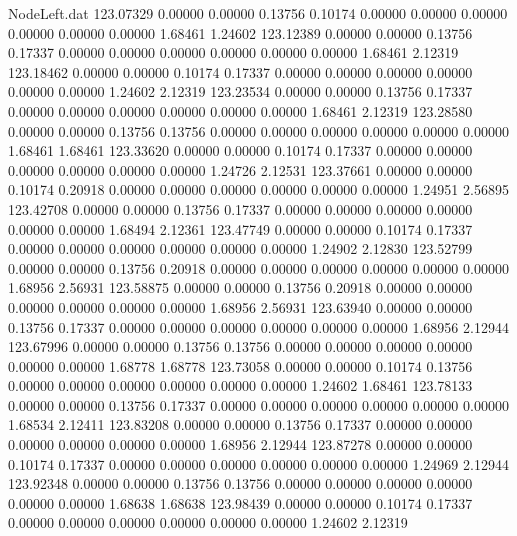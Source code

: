 \begin{filecontents}{NodeLeft.dat}
 123.07329    0.00000    0.00000     0.13756    0.10174    0.00000    0.00000    0.00000    0.00000    0.00000    0.00000    1.68461    1.24602
 123.12389    0.00000    0.00000     0.13756    0.17337    0.00000    0.00000    0.00000    0.00000    0.00000    0.00000    1.68461    2.12319
 123.18462    0.00000    0.00000     0.10174    0.17337    0.00000    0.00000    0.00000    0.00000    0.00000    0.00000    1.24602    2.12319
 123.23534    0.00000    0.00000     0.13756    0.17337    0.00000    0.00000    0.00000    0.00000    0.00000    0.00000    1.68461    2.12319
 123.28580    0.00000    0.00000     0.13756    0.13756    0.00000    0.00000    0.00000    0.00000    0.00000    0.00000    1.68461    1.68461
 123.33620    0.00000    0.00000     0.10174    0.17337    0.00000    0.00000    0.00000    0.00000    0.00000    0.00000    1.24726    2.12531
 123.37661    0.00000    0.00000     0.10174    0.20918    0.00000    0.00000    0.00000    0.00000    0.00000    0.00000    1.24951    2.56895
 123.42708    0.00000    0.00000     0.13756    0.17337    0.00000    0.00000    0.00000    0.00000    0.00000    0.00000    1.68494    2.12361
 123.47749    0.00000    0.00000     0.10174    0.17337    0.00000    0.00000    0.00000    0.00000    0.00000    0.00000    1.24902    2.12830
 123.52799    0.00000    0.00000     0.13756    0.20918    0.00000    0.00000    0.00000    0.00000    0.00000    0.00000    1.68956    2.56931
 123.58875    0.00000    0.00000     0.13756    0.20918    0.00000    0.00000    0.00000    0.00000    0.00000    0.00000    1.68956    2.56931
 123.63940    0.00000    0.00000     0.13756    0.17337    0.00000    0.00000    0.00000    0.00000    0.00000    0.00000    1.68956    2.12944
 123.67996    0.00000    0.00000     0.13756    0.13756    0.00000    0.00000    0.00000    0.00000    0.00000    0.00000    1.68778    1.68778
 123.73058    0.00000    0.00000     0.10174    0.13756    0.00000    0.00000    0.00000    0.00000    0.00000    0.00000    1.24602    1.68461
 123.78133    0.00000    0.00000     0.13756    0.17337    0.00000    0.00000    0.00000    0.00000    0.00000    0.00000    1.68534    2.12411
 123.83208    0.00000    0.00000     0.13756    0.17337    0.00000    0.00000    0.00000    0.00000    0.00000    0.00000    1.68956    2.12944
 123.87278    0.00000    0.00000     0.10174    0.17337    0.00000    0.00000    0.00000    0.00000    0.00000    0.00000    1.24969    2.12944
 123.92348    0.00000    0.00000     0.13756    0.13756    0.00000    0.00000    0.00000    0.00000    0.00000    0.00000    1.68638    1.68638
 123.98439    0.00000    0.00000     0.10174    0.17337    0.00000    0.00000    0.00000    0.00000    0.00000    0.00000    1.24602    2.12319

\end{filecontents}
